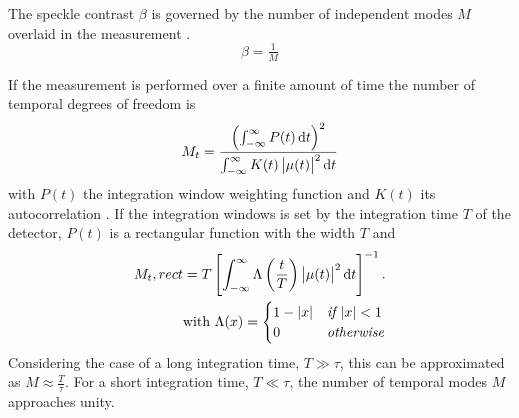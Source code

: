 The speckle contrast $\beta$ is governed by the number of independent modes $M$ overlaid in the measurement \cite{goodman2000}.
\begin{equation}
\beta =\tfrac{1}{M}
\end{equation}

If the measurement is performed over a finite amount of time the number of temporal degrees of freedom is
\begin{equation}
M_t=\frac{\left(\int_{-\infty}^{\infty} P(t)\operatorname{\mathrm{d}\!} t\right)^2}{\int_{-\infty}^{\infty} K(t) \left|\mu(t)\right|^2\operatorname{\mathrm{d}\!} t}
\label{eq:modes}
\end{equation}
with $P(t)$ the integration window weighting function and $K(t)$ its autocorrelation \cite{goodman2007}. If the integration windows is set by the integration time $T$ of the detector, $P(t)$ is a rectangular function with the width $T$ and
\begin{align}
M_t,rect =T \left[\int_{-\infty}^{\infty} \Lambda\left(\frac{t}{T}\right) \left|\mu(t)\right|^2 \operatorname{\mathrm{d}\!} t \right]^{-1} .\\
\text{with  }\Lambda(x) = \begin{cases} 
 1-\left|x\right|& \textit{if }|x|<1\\
0 & \textit{otherwise}\\ 
\end{cases}
\label{eq:modesapprox}
\end{align}
Considering the case of a long integration time, $T\gg\tau$, this can be approximated as $M\approx\frac{T}{\tau}$. For a short integration time,  $T\ll\tau$, the number of temporal modes $M$ approaches unity.

